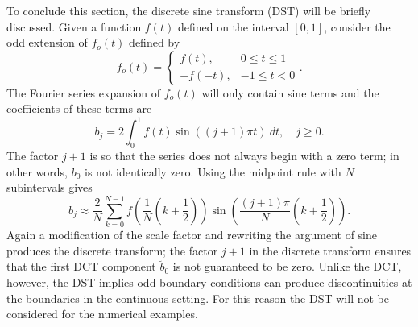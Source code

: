 \documentclass[12pt,notitlepage]{report}
\newcommand{\dct}[1]{\breve{#1}}	%
\begin{document}
To conclude this section, the discrete sine transform (DST) will be briefly discussed. Given a function $f(t)$ defined on the interval $[0,1]$, consider the odd extension of $f_o(t)$ defined by
\[f_o(t) = \begin{cases}
f(t), & 0 \leq t \leq 1 \\
-f(-t), & -1 \leq t < 0
\end{cases}.\]
The Fourier series expansion of $f_o(t)$ will only contain sine terms and the coefficients of these terms are
\[b_j = 2\int_0^1 f(t) \sin((j+1)\pi{t})~dt, \quad j \geq 0.\]
The factor $j+1$ is so that the series does not always begin with a zero term; in other words, $b_0$ is not identically zero. Using the midpoint rule with $N$ subintervals gives
\[b_j \approx \frac{2}{N}\sum_{k=0}^{N-1} f\left(\frac{1}{N}\left(k+\frac{1}{2}\right)\right)\sin\left(\frac{(j+1)\pi}{N}\left(k+\frac{1}{2}\right)\right).\]
Again a modification of the scale factor and rewriting the argument of sine produces the discrete transform; the factor $j+1$ in the discrete transform ensures that the first DCT component $\dct{b}_0$ is not guaranteed to be zero. Unlike the DCT, however, the DST implies odd boundary conditions can produce discontinuities at the boundaries in the continuous setting. For this reason the DST will not be considered for the numerical examples.
\end{document}
